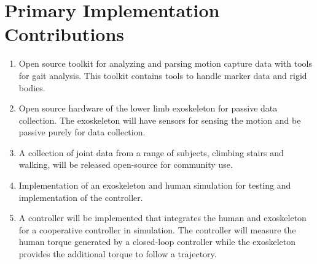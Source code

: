 \section{Primary Implementation Contributions}
\begin{enumerate}[wide, nosep, labelindent = 0pt, topsep = 1ex]
    \item Open source toolkit for analyzing and parsing motion capture data with tools for gait analysis. This toolkit contains tools to handle marker data and rigid bodies.  
    \item Open source hardware of the lower limb exoskeleton for passive data collection. The exoskeleton will have sensors for sensing the motion and be passive purely for data collection.
    \item A collection of joint data from a range of subjects, climbing stairs and walking, will be released open-source for community use.  
    \item Implementation of an exoskeleton and human simulation for testing and implementation of the controller.
    \item A controller will be implemented that integrates the human and exoskeleton for a cooperative controller in simulation. The controller will measure the human torque generated by a closed-loop controller while the exoskeleton provides the additional torque to follow a trajectory.  
\end{enumerate}